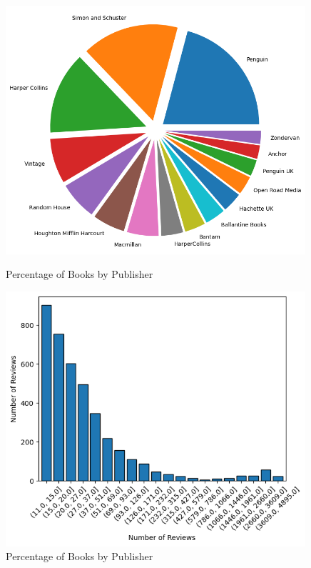 \documentclass[12pt]{article}
\numberwithin{equation}{section}
\begin{document}
   \begin{figure}[ht]
    \begin{minipage}[b]{0.49\linewidth}
    \centering
    \includegraphics[width=0.99\textwidth]{publisher_counts.png}
    \caption{Percentage of Books by Publisher}
   \end{minipage}
    \hspace{0.01cm}
\begin{minipage}[b]{0.49\linewidth}
    \centering
    \includegraphics[width=0.99\textwidth]{reviewcount.png}
    \caption{Percentage of Books by Publisher}
    \end{minipage}
\end{figure}
\end{document}

